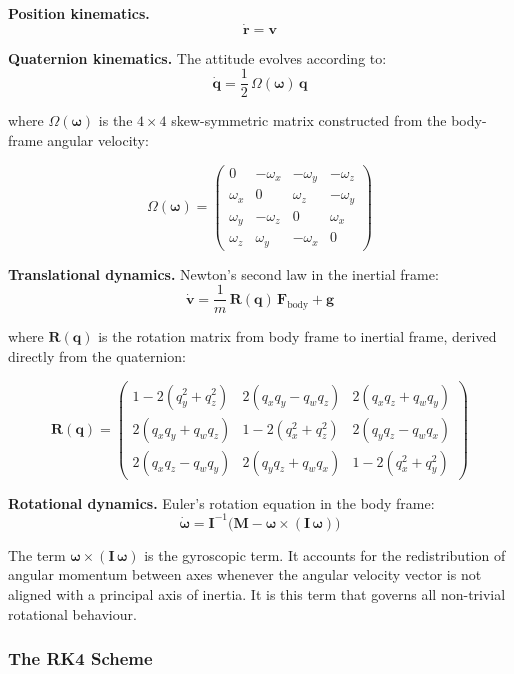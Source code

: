 \documentclass[11pt,a4paper]{article}
\begin{document}
\medskip
\textbf{Position kinematics.}
\[
\dot{\mathbf{r}} = \mathbf{v}
\]

\medskip
\textbf{Quaternion kinematics.} The attitude evolves according to:
\[
\dot{\mathbf{q}} = \frac{1}{2}\,\Omega(\boldsymbol{\omega})\,\mathbf{q}
\]

where $\Omega(\boldsymbol{\omega})$ is the $4\times4$ skew-symmetric matrix constructed from the body-frame angular velocity:

\[
\Omega(\boldsymbol{\omega}) =
\begin{pmatrix}
 0        & -\omega_x & -\omega_y & -\omega_z \\
 \omega_x &  0        &  \omega_z & -\omega_y \\
 \omega_y & -\omega_z &  0        &  \omega_x \\
 \omega_z &  \omega_y & -\omega_x &  0
\end{pmatrix}
\]

\medskip
\textbf{Translational dynamics.} Newton's second law in the inertial frame:
\[
\dot{\mathbf{v}} = \frac{1}{m}\,\mathbf{R}(\mathbf{q})\,\mathbf{F}_{\text{body}} + \mathbf{g}
\]

where $\mathbf{R}(\mathbf{q})$ is the rotation matrix from body frame to inertial frame, derived directly from the quaternion:

\[
\mathbf{R}(\mathbf{q}) =
\begin{pmatrix}
1 - 2(q_y^2+q_z^2)   & 2(q_xq_y - q_wq_z) & 2(q_xq_z + q_wq_y) \\
2(q_xq_y + q_wq_z)   & 1 - 2(q_x^2+q_z^2) & 2(q_yq_z - q_wq_x) \\
2(q_xq_z - q_wq_y)   & 2(q_yq_z + q_wq_x) & 1 - 2(q_x^2+q_y^2)
\end{pmatrix}
\]

\medskip
\textbf{Rotational dynamics.} Euler's rotation equation in the body frame:
\[
\dot{\boldsymbol{\omega}} = \mathbf{I}^{-1}\bigl(\mathbf{M} - \boldsymbol{\omega}\times(\mathbf{I}\,\boldsymbol{\omega})\bigr)
\]

The term $\boldsymbol{\omega}\times(\mathbf{I}\,\boldsymbol{\omega})$ is the gyroscopic term. It accounts for the redistribution of angular momentum between axes whenever the angular velocity vector is not aligned with a principal axis of inertia. It is this term that governs all non-trivial rotational behaviour.

\subsubsection{The RK4 Scheme}
\end{document}
